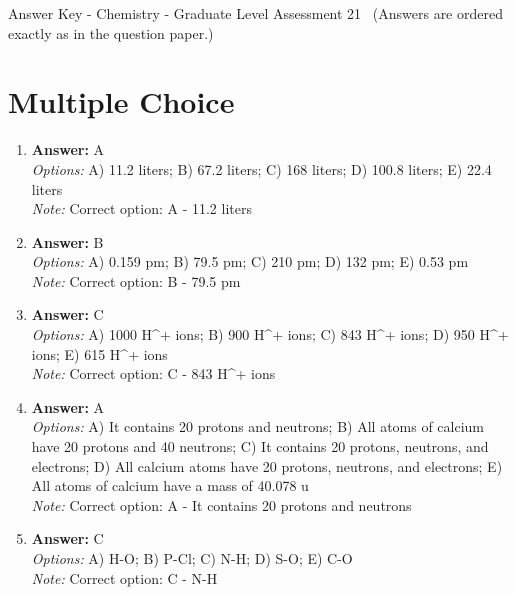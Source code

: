 \documentclass[12pt]{article}
\begin{document}
\begin{center}
Answer Key - Chemistry - Graduate Level Assessment 21 \
\small (Answers are ordered exactly as in the question paper.)
\end{center}

\section*{Multiple Choice}
\begin{enumerate}[label=\arabic*.]
\item \textbf{Answer:} A
\\ \textit{Options:} A) 11.2 liters; B) 67.2 liters; C) 168 liters; D) 100.8 liters; E) 22.4 liters
\\ \textit{Note:} Correct option: A - 11.2 liters
\item \textbf{Answer:} B
\\ \textit{Options:} A) 0.159 pm; B) 79.5 pm; C) 210 pm; D) 132 pm; E) 0.53 pm
\\ \textit{Note:} Correct option: B - 79.5 pm
\item \textbf{Answer:} C
\\ \textit{Options:} A) 1000 H^+ ions; B) 900 H^+ ions; C) 843 H^+ ions; D) 950 H^+ ions; E) 615 H^+ ions
\\ \textit{Note:} Correct option: C - 843 H^+ ions
\item \textbf{Answer:} A
\\ \textit{Options:} A) It contains 20 protons and neutrons; B) All atoms of calcium have 20 protons and 40 neutrons; C) It contains 20 protons, neutrons, and electrons; D) All calcium atoms have 20 protons, neutrons, and electrons; E) All atoms of calcium have a mass of 40.078 u
\\ \textit{Note:} Correct option: A - It contains 20 protons and neutrons
\item \textbf{Answer:} C
\\ \textit{Options:} A) H-O; B) P-Cl; C) N-H; D) S-O; E) C-O
\\ \textit{Note:} Correct option: C - N-H
\end{enumerate}
\end{document}

